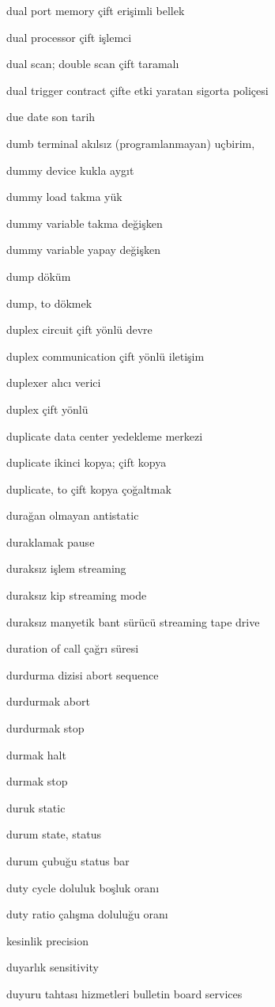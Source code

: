 \documentclass[12pt,fleqn]{article}\usepackage{../../common}
\begin{document}
dual port memory çift erişimli bellek

dual processor çift işlemci

dual scan; double scan çift taramalı

dual trigger contract çifte etki yaratan sigorta poliçesi

due date son tarih

dumb terminal akılsız (programlanmayan) uçbirim,

dummy device kukla aygıt

dummy load takma yük

dummy variable takma değişken

dummy variable yapay değişken

dump döküm

dump, to dökmek

duplex circuit çift yönlü devre

duplex communication çift yönlü iletişim

duplexer alıcı verici

duplex çift yönlü

duplicate data center yedekleme merkezi

duplicate ikinci kopya; çift kopya

duplicate, to çift kopya çoğaltmak

durağan olmayan antistatic

duraklamak pause

duraksız işlem streaming

duraksız kip streaming mode

duraksız manyetik bant sürücü streaming tape drive

duration of call çağrı süresi

durdurma dizisi abort sequence

durdurmak abort

durdurmak stop

durmak halt

durmak stop

duruk static

durum state, status

durum çubuğu status bar

duty cycle doluluk boşluk oranı

duty ratio çalışma doluluğu oranı

kesinlik precision

duyarlık sensitivity

duyuru tahtası hizmetleri bulletin board services
\end{document}
